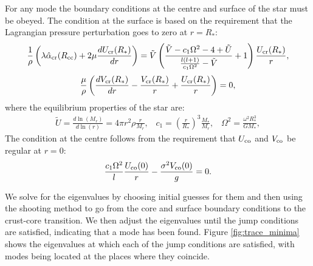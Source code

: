 \documentclass[fleqn,usenatbib]{mnras}
\begin{document}
\hspace{\parindent}For any mode the boundary conditions at the centre and surface of the star must be obeyed. The condition at the surface is based on the requirement that the Lagrangian pressure perturbation goes to zero at $r=R_*$:
\begin{align}
\frac{1}{\rho}\left(\lambda\hat{\alpha}_{\rm cr}(R_{\rm cc})+2\mu\frac{dU_{\rm cr}(R_*)}{dr}\right)=\tilde{V}\left(\frac{\tilde{V}-c_1\Omega^2-4+\tilde{U}}{\frac{l(l+1)}{c_1\Omega^2}-\tilde{V}}+1\right)\frac{U_{\rm cr}(R_*)}{r},
\label{eq:surface_boundary_modified_1}
\end{align}
\begin{align}
\frac{\mu}{\rho}\left(\frac{dV_{\rm cr}(R_*)}{dr}-\frac{V_{\rm cr}(R_*)}{r}+\frac{U_{\rm cr}(R_*)}{r}\right)=0,
\label{eq:surface_boundary_modified_2}
\end{align}
\noindent where the equilibrium properties of the star are: 
\begin{align}\nonumber
\tilde{U}=\frac{d\ln\left(M_r\right)}{d\ln\left(r\right)}=4\pi r^2\rho\frac{r}{M_r},\;\;\;c_1=\left(\frac{r}{R_*}\right)^3\frac{M_*}{M_r},\;\;\;\Omega^2=\frac{\omega^2R_*^3}{GM_*},
\end{align}
\noindent The condition at the centre follows from the requirement that $U_{\rm co}$ and $V_{\rm co}$ be regular at $r=0$: %
\begin{align}
\frac{c_1\Omega^2}{l}\frac{U_{\rm co}(0)}{r}-\frac{\sigma^2V_{\rm co}(0)}{g}=0.
\label{eq:core_condition}
\end{align}



\hspace{\parindent}We solve for the eigenvalues by choosing initial guesses for them and then using the shooting method to go from the core and surface boundary conditions to the crust-core transition. We then adjust the eigenvalues until the jump conditions are satisfied, indicating that a mode has been found. Figure \ref{fig:trace_minima} shows the eigenvalues at which each of the jump conditions are satisfied, with modes being located at the places where they coincide.
\end{document}
